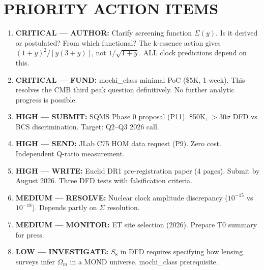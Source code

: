 \documentclass[11pt]{article}
\begin{document}
\section{PRIORITY ACTION ITEMS}

\begin{tcolorbox}[colback=yellow!5!white, colframe=yellow!70!black,
  title=\textbf{ACTION ITEMS (RANKED BY PRIORITY)}]

\begin{enumerate}

\item \textbf{CRITICAL --- AUTHOR:}  Clarify screening function
  $\Sigma(y)$.  Is it derived or postulated?  From which functional?
  The k-essence action gives $(1+y)^2/[y(3+y)]$, not $1/\sqrt{1+y}$.
  ALL clock predictions depend on this.

\item \textbf{CRITICAL --- FUND:}  mochi\_class minimal PoC (\$5K,
  1 week).  This resolves the CMB third peak question definitively.
  No further analytic progress is possible.

\item \textbf{HIGH --- SUBMIT:}  SQMS Phase 0 proposal (P11).  \$50K,
  $>30\sigma$ DFD vs BCS discrimination.  Target: Q2--Q3 2026 call.

\item \textbf{HIGH --- SEND:}  JLab C75 HOM data request (P9).  Zero
  cost.  Independent Q-ratio measurement.

\item \textbf{HIGH --- WRITE:}  Euclid DR1 pre-registration paper
  (4 pages).  Submit by August 2026.  Three DFD tests with
  falsification criteria.

\item \textbf{MEDIUM --- RESOLVE:}  Nuclear clock amplitude discrepancy
  ($10^{-15}$ vs $10^{-18}$).  Depends partly on $\Sigma$ resolution.

\item \textbf{MEDIUM --- MONITOR:}  ET site selection (2026).
  Prepare T0 summary for press.

\item \textbf{LOW --- INVESTIGATE:}  $S_8$ in DFD requires specifying
  how lensing surveys infer $\Omega_m$ in a MOND universe.
  mochi\_class prerequisite.

\end{enumerate}
\end{tcolorbox}
\end{document}
